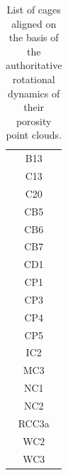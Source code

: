 \documentclass[journal=jacsat,manuscript=article]{achemso}
\begin{document}
{\begin{table}[h!]
  \caption{\color{red}List of cages aligned on the basis of the authoritative rotational dynamics of their porosity point clouds.}
  \label{tbl:aligned_via_rotational_dynamics}
  \centering
  \begin{tabular}{c}
    \toprule
B13 \\
C13 \\
C20 \\
CB5 \\
CB6 \\
CB7 \\
CD1 \\
CP1 \\
CP3 \\
CP4 \\
CP5 \\
IC2 \\
MC3 \\
NC1 \\
NC2 \\
RCC3a \\
WC2 \\
WC3 \\
    \bottomrule
  \end{tabular}
\end{table}

}
\end{document}
